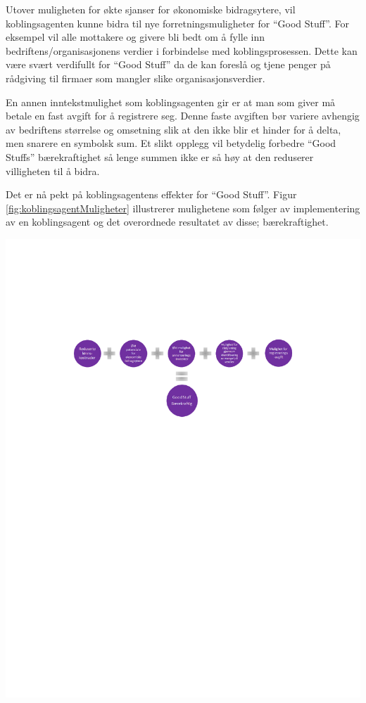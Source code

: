 Utover muligheten for økte sjanser for økonomiske bidragsytere, vil koblingsagenten kunne bidra til nye forretningsmuligheter for ``Good Stuff''. For eksempel vil alle mottakere og givere bli bedt om å fylle inn bedriftens/organisasjonens verdier i forbindelse med koblingsprosessen. Dette kan være svært verdifullt for “Good Stuff” da de kan foreslå og tjene penger på rådgiving til firmaer som mangler slike organisasjonsverdier.

En annen inntekstmulighet som koblingsagenten gir er at man som giver må betale en fast avgift for å registrere seg. Denne faste avgiften bør variere avhengig av bedriftens størrelse og omsetning slik at den ikke blir et hinder for å delta, men snarere en symbolsk sum. Et slikt opplegg vil betydelig forbedre “Good Stuffs” bærekraftighet så lenge summen ikke er så høy at den reduserer villigheten til å bidra.

Det er nå pekt på koblingsagentens effekter for ``Good Stuff''. Figur \ref{fig:koblingsagentMuligheter} illustrerer mulighetene som følger av implementering av en koblingsagent og det overordnede resultatet av disse; bærekraftighet.

\begin{center}
\includegraphics[clip=true, width=1 \textwidth,
trim=4cm 16cm 4cm 4cm]{koblingsagentMuligheter.pdf}
\label{fig:koblingsagentMuligheter}
\end{center}

